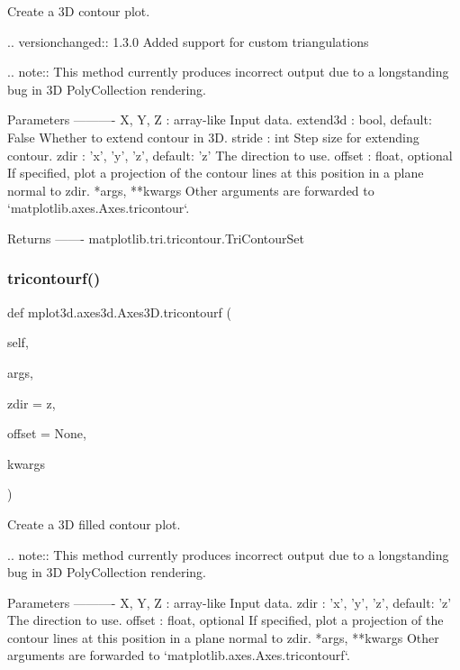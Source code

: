 \begin{DoxyVerb}
\begin{DoxyVerb}Create a 3D contour plot.

.. versionchanged:: 1.3.0
    Added support for custom triangulations

.. note::
    This method currently produces incorrect output due to a
    longstanding bug in 3D PolyCollection rendering.

Parameters
----------
X, Y, Z : array-like
    Input data.
extend3d : bool, default: False
    Whether to extend contour in 3D.
stride : int
    Step size for extending contour.
zdir : {'x', 'y', 'z'}, default: 'z'
    The direction to use.
offset : float, optional
    If specified, plot a projection of the contour lines at this
    position in a plane normal to zdir.
*args, **kwargs
    Other arguments are forwarded to `matplotlib.axes.Axes.tricontour`.

Returns
-------
matplotlib.tri.tricontour.TriContourSet
\end{DoxyVerb}
 \mbox{\label{classmplot3d_1_1axes3d_1_1Axes3D_a6c15c3a50369b4cac40bde8f134586e2}} 
\subsubsection{\texorpdfstring{tricontourf()}{tricontourf()}}
{\footnotesize\ttfamily def mplot3d.\+axes3d.\+Axes3\+D.\+tricontourf (\begin{DoxyParamCaption}\item[{}]{self,  }\item[{}]{args,  }\item[{}]{zdir = {\ttfamily \textquotesingle{}z\textquotesingle{}},  }\item[{}]{offset = {\ttfamily None},  }\item[{}]{kwargs }\end{DoxyParamCaption})}

\begin{DoxyVerb}Create a 3D filled contour plot.

.. note::
    This method currently produces incorrect output due to a
    longstanding bug in 3D PolyCollection rendering.

Parameters
----------
X, Y, Z : array-like
    Input data.
zdir : {'x', 'y', 'z'}, default: 'z'
    The direction to use.
offset : float, optional
    If specified, plot a projection of the contour lines at this
    position in a plane normal to zdir.
*args, **kwargs
    Other arguments are forwarded to
    `matplotlib.axes.Axes.tricontourf`.


\end{DoxyVerb}
\end{DoxyVerb}
